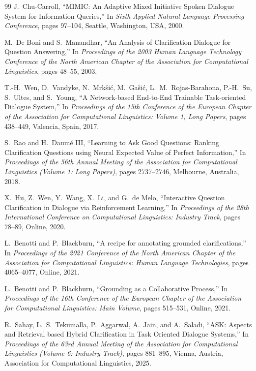 \documentclass[11pt]{article}
\begin{document}
\begin{thebibliography}{99}
J.~Chu-Carroll,
\newblock ``MIMIC: An Adaptive Mixed Initiative Spoken Dialogue System for Information Queries,''
\newblock In \emph{Sixth Applied Natural Language Processing Conference}, pages 97--104, Seattle, Washington, USA, 2000.

M.~De Boni and S.~Manandhar,
\newblock ``An Analysis of Clarification Dialogue for Question Answering,''
\newblock In \emph{Proceedings of the 2003 Human Language Technology Conference of the North American Chapter of the Association for Computational Linguistics}, pages 48--55, 2003.

T.-H.~Wen, D.~Vandyke, N.~Mrk{\v{s}}i{\'c}, M.~Ga{\v{s}}i{\'c}, L.~M.~Rojas-Barahona, P.-H.~Su, S.~Ultes, and S.~Young,
\newblock ``A Network-based End-to-End Trainable Task-oriented Dialogue System,''
\newblock In \emph{Proceedings of the 15th Conference of the European Chapter of the Association for Computational Linguistics: Volume 1, Long Papers}, pages 438--449, Valencia, Spain, 2017.

S.~Rao and H.~Daum{\'e} III,
\newblock ``Learning to Ask Good Questions: Ranking Clarification Questions using Neural Expected Value of Perfect Information,''
\newblock In \emph{Proceedings of the 56th Annual Meeting of the Association for Computational Linguistics (Volume 1: Long Papers)}, pages 2737--2746, Melbourne, Australia, 2018.

X.~Hu, Z.~Wen, Y.~Wang, X.~Li, and G.~de Melo,
\newblock ``Interactive Question Clarification in Dialogue via Reinforcement Learning,''
\newblock In \emph{Proceedings of the 28th International Conference on Computational Linguistics: Industry Track}, pages 78--89, Online, 2020.

L.~Benotti and P.~Blackburn,
\newblock ``A recipe for annotating grounded clarifications,''
\newblock In \emph{Proceedings of the 2021 Conference of the North American Chapter of the Association for Computational Linguistics: Human Language Technologies}, pages 4065--4077, Online, 2021.

L.~Benotti and P.~Blackburn,
\newblock ``Grounding as a Collaborative Process,''
\newblock In \emph{Proceedings of the 16th Conference of the European Chapter of the Association for Computational Linguistics: Main Volume}, pages 515--531, Online, 2021.

R.~Sahay, L.~S.~Tekumalla, P.~Aggarwal, A.~Jain, and A.~Saladi,
\newblock ``ASK: Aspects and Retrieval based Hybrid Clarification in Task Oriented Dialogue Systems,''
\newblock In \emph{Proceedings of the 63rd Annual Meeting of the Association for Computational Linguistics (Volume 6: Industry Track)}, pages 881--895, Vienna, Austria, Association for Computational Linguistics, 2025.


\end{thebibliography}
\end{document}
